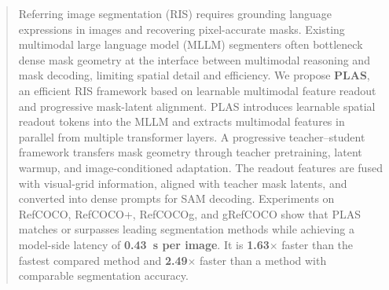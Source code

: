 
\begin{abstract}
	Referring image segmentation (RIS) requires grounding
	language expressions in images and recovering pixel-accurate
	masks. Existing multimodal large language model (MLLM)
	segmenters often bottleneck dense mask geometry at the
	interface between multimodal reasoning and mask decoding,
	limiting spatial detail and efficiency. We propose
	\textbf{PLAS}, an efficient RIS framework based on learnable
	multimodal feature readout and progressive mask-latent
	alignment. PLAS introduces learnable spatial readout tokens
	into the MLLM and extracts multimodal features in parallel
	from multiple transformer layers. A progressive teacher--student
	framework transfers mask geometry through teacher pretraining,
	latent warmup, and image-conditioned adaptation. The readout
	features are fused with visual-grid information, aligned with
	teacher mask latents, and converted into dense prompts for SAM
	decoding. Experiments on RefCOCO, RefCOCO+, RefCOCOg, and
	gRefCOCO show that PLAS matches or surpasses leading
	segmentation methods while achieving a model-side latency of
	\textbf{0.43~s per image}. It is \textbf{1.63$\times$} faster than
	the fastest compared method and \textbf{2.49$\times$} faster
	than a method with comparable segmentation accuracy.
\end{abstract}
